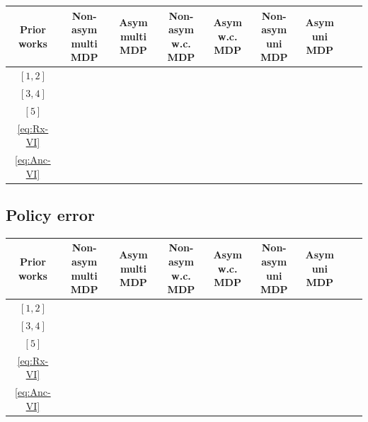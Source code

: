 \documentclass{article} %
\newcommand{\cmark}{\ding{51}}%
\newcommand{\xmark}{\ding{55}}%
\begin{document}
\begin{center}
\begin{tabular}{ |c|c|c|c|c|c|c|c|c| }
 \hline
 Prior works & \makecell{Non-asym \\ multi MDP}& \makecell{Asym  \\ multi MDP}&  \makecell{Non-asym  \\ w.c. MDP}& \makecell{Asym  \\ w.c. MDP} &
  \makecell{Non-asym  \\ uni MDP}& \makecell{Asym  \\ uni MDP}  \\
  \hline 
  $[1,2]$  & \xmark & \xmark & \xmark & \xmark & \cmark &  \cmark \\
   $[3,4]$& \xmark & \cmark & \xmark & \cmark & \cmark &  \cmark \\ 
    $[5]$& \xmark & \xmark & \xmark & \xmark & \cmark &  \cmark \\
  \hline
  \ref{eq:Rx-VI}  & \cmark & \cmark & \cmark & \cmark & \cmark &  \cmark \\
  \ref{eq:Anc-VI}  & \cmark & \cmark & \cmark & \cmark & \cmark&  \cmark \\
  \hline
\end{tabular}
\end{center}    

\subsection{Policy error}\label{table_near-optimal_policy} 

\begin{center}
\begin{tabular}{ |c|c|c|c|c|c|c|c|c| }
 \hline
 Prior works & \makecell{Non-asym \\ multi MDP}& \makecell{Asym  \\ multi MDP}&  \makecell{Non-asym  \\ w.c. MDP}& \makecell{Asym  \\ w.c. MDP} &
  \makecell{Non-asym  \\ uni MDP}& \makecell{Asym  \\ uni MDP}  \\
  \hline 
  $[1,2]$  & \xmark & \xmark & \xmark & \xmark & \cmark &  \cmark \\
   $[3,4]$  & \xmark & \cmark & \xmark & \cmark & \cmark &  \cmark \\ 
    $[5]$& \xmark & \xmark & \xmark & \xmark & \cmark &  \cmark \\
  \hline
  \ref{eq:Rx-VI}  & \cmark & \cmark & \cmark & \cmark & \cmark &  \cmark \\
  \ref{eq:Anc-VI}  & \cmark & \cmark & \cmark & \cmark & \cmark&  \cmark \\
  \hline
\end{tabular}
\end{center}    
\end{document}
